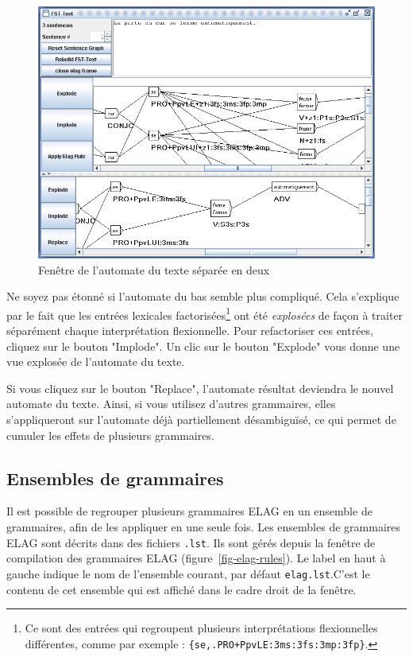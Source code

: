 \begin{figure}[!h]
\begin{center}
\includegraphics[width=12cm]{resources/img/fig7-18.png}
\caption{Fenêtre de l’automate du texte séparée en deux \label{fig-text-auto2}}
\end{center}
\end{figure}


\bigskip
\noindent Ne soyez pas étonné si l’automate du bas semble plus compliqué. Cela s’explique par
le fait que les entrées lexicales factorisées\footnote{Ce sont des entrées qui regroupent
 plusieurs interprétations flexionnelles différentes, comme par exemple :
\texttt{\{se,.PRO+PpvLE:3ms:3fs:3mp:3fp\}}.}
ont été \textit{explosées} de façon à traiter séparément chaque interprétation flexionnelle.
Pour refactoriser ces entrées, cliquez sur le bouton "Implode". Un clic sur le bouton 
"Explode" vous donne une vue explosée de l’automate du texte.

\bigskip
\noindent Si vous cliquez sur le bouton "Replace", l’automate résultat deviendra le nouvel
automate du texte. Ainsi, si vous utilisez d’autres grammaires, elles s’appliqueront sur l’automate
déjà partiellement désambiguïsé, ce qui permet de cumuler les effets de plusieurs grammaires.



\subsection{Ensembles de grammaires}
Il est possible de regrouper plusieurs grammaires ELAG en un ensemble de grammaires,
afin de les appliquer en une seule fois. Les ensembles de grammaires ELAG sont décrits dans
des fichiers \verb+.lst+. Ils sont gérés depuis la fenêtre de compilation
des grammaires ELAG (figure~\ref{fig-elag-rules}). Le label en haut à gauche indique le nom de 
l’ensemble courant, par défaut \verb+elag.lst+.C’est le contenu de cet ensemble qui est affiché
dans le cadre droit de la fenêtre.


